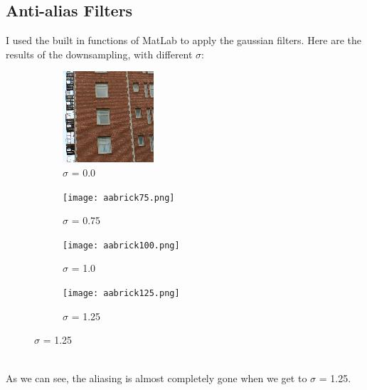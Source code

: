 \documentclass{article}
\begin{document}
\newpage
\subsection{Anti-alias Filters}
I used the built in functions of MatLab to apply the gaussian filters.
Here are the results of the downsampling, with different $\sigma$:
\begin{figure}[h]
	\centering
	\begin{subfigure}[b]{0.49\textwidth}
		\includegraphics[width = \textwidth]{aliasbrick4.png}
		\caption{$\sigma$ = 0.0}
		\label{fig:aliasbrick4.png}
	\end{subfigure}
	\begin{subfigure}[b]{0.49\textwidth}
		\texttt{[image: aabrick75.png]}
		\caption{$\sigma$ = 0.75}
		\label{fig:aabrick75.png}
	\end{subfigure}
	\begin{subfigure}[b]{0.49\textwidth}
		\texttt{[image: aabrick100.png]}
		\caption{$\sigma$ = 1.0}
		\label{fig:aabrick100.png}
	\end{subfigure}
	\begin{subfigure}[b]{0.49\textwidth}
		\texttt{[image: aabrick125.png]}
		\caption{$\sigma$ = 1.25}
		\label{fig:aabrick125.png}
	\end{subfigure}
\end{figure}
\\
As we can see, the aliasing is almost completely gone when we get to $\sigma$ = 1.25.
\end{document}
